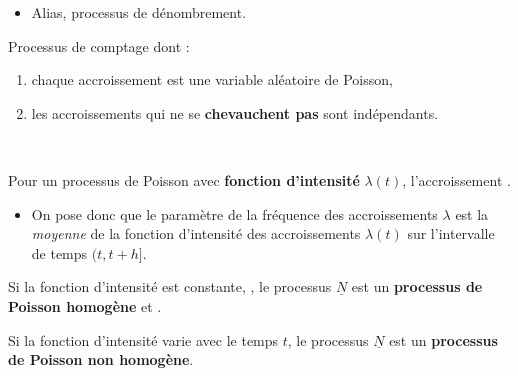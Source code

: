 \documentclass[10pt, french]{article}
\begin{document}
\begin{multicols*}{2}
\begin{definitionNOHFILLsub}
\tcbline

\begin{itemize}
	\item	Alias, processus de dénombrement.
\end{itemize}
\end{definitionNOHFILLsub}

\begin{definitionNOHFILLsub}
Processus de comptage dont :
\begin{enumerate}
	\item	chaque accroissement est une variable aléatoire de Poisson,
	\item	les accroissements qui ne se \textbf{chevauchent pas} sont indépendants.
\end{enumerate}

\

Pour un processus de Poisson avec \textbf{fonction d'intensité} $\lambda(t)$, l'accroissement . 
\begin{itemize}
	\item	On pose donc que le paramètre de la fréquence des accroissements $\lambda$ est la \textit{moyenne} de la fonction d'intensité des accroissements $\lambda(t)$ sur l'intervalle de temps $(t, t + h]$.
\end{itemize}

\begin{definitionNOHFILLprop}
Si la fonction d'intensité est constante, , le processus $\underline{N}$ est un \textbf{processus de Poisson homogène} et .
\end{definitionNOHFILLprop}

\begin{definitionNOHFILLprop}
Si la fonction d'intensité varie avec le temps $t$, le processus $\underline{N}$ est un \textbf{processus de Poisson non homogène}.
\end{definitionNOHFILLprop}
\end{definitionNOHFILLsub}


\columnbreak

\end{multicols*}
\end{document}
